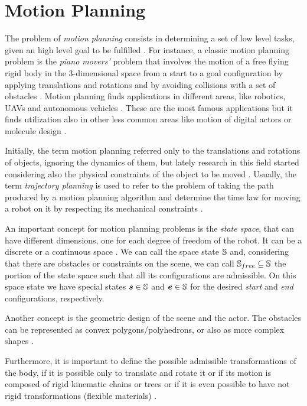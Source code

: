 \documentclass[dissertation.tex]{subfiles}
\begin{document}
\chapter{Motion Planning}
The problem of \emph{motion planning} consists in determining a set of
low level tasks, given an high level goal to be fulfilled
\cite{choset}. For instance, a classic motion planning problem is the
\emph{piano movers'} problem that involves the motion of a free flying rigid 
body in the 3-dimensional space
 from a start to a goal configuration by applying
translations and rotations and by avoiding collisions with a set
of obstacles \cite{choset}\cite{lavalle}. Motion planning finds
applications in 
different areas, like robotics, \acp{UAV} \cite{goerzen} and autonomous
vehicles \cite{paden}. These are the most
famous applications but it finds utilization also in other less
common areas like motion of digital actors or molecule design
\cite{choset}.

Initially, the term motion planning referred only to the translations
and rotations of objects, ignoring the dynamics of them, but lately
research in this field started considering also the physical
constraints of the object to be moved \cite{lavalle}. Usually, the term
\emph{trajectory planning} is used to refer to the problem of taking
the path produced by a
motion planning algorithm and determine the time law for moving a
robot on it by
respecting its mechanical constraints \cite{lavalle}.

An important concept for motion planning problems is the \emph{state
  space},
that can have different dimensions, one for each degree of freedom of
the robot. It can be a discrete or a continuous space
\cite{lavalle}. We can call the space state $\mathbb{S}$
and, considering that there are obstacles or constraints on the scene,
we can call $\mathbb{S}_{free}\subseteq\mathbb{S}$
the portion of the state space such that all its configurations
are admissible. On this space state we have
special states $\boldsymbol{s}\in\mathbb{S}$ and $\boldsymbol{e}\in\mathbb{S}$ for the
desired \emph{start} and \emph{end} configurations, respectively.

Another concept is the geometric design of the scene and the
actor. The obstacles can be represented as convex
polygons/polyhedrons, or also as more complex
shapes \cite{lavalle}.

Furthermore, it is important to define the possible admissible
transformations of the body, if it is 
possible only to translate and rotate it or if its motion is composed of
rigid kinematic chains or trees or if it is even possible to have not
rigid transformations (flexible materials) \cite{lavalle}.
\end{document}
